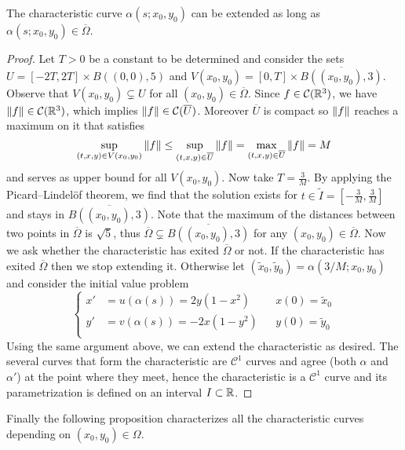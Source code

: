\begin{prop} \label{prop:characteristics_extension}
	The characteristic curve $\alpha(s;x_0,y_0)$ can be extended as
	long as $\alpha(s;x_0,y_0) \in \overline{\Omega}$.
\end{prop}
\begin{proof}
	Let $T > 0$ be a constant to be determined and consider the sets $U = [-2T,
	2T] \times B((0,0), 5)$ and $V(x_0,y_0) = [0,T] \times
	\overline{B((x_0,y_0), 3)}$. Observe that $V(x_0,y_0) \subsetneq U$ for all
	$(x_0,y_0) \in \overline{\Omega}$. Since $f \in \mathcal{C}(\mathbb{R}^3)$, we
	have $\norm{f} \in \mathcal{C}(\mathbb{R}^3)$, which implies $\norm{f} \in
	\mathcal{C}(\overline{U})$. Moreover $\overline{U}$ is compact so $\norm{f}$
	reaches a maximum on it that satisfies
	\[
	\sup_{(t,x,y) \in V(x_0,y_0)} \norm{f} \leq
	\sup_{(t,x,y) \in \overline{U}} \norm{f} = 
	\max_{(t,x,y) \in \overline{U}} \norm{f} = M	
	\]
	and serves as upper bound for all $V(x_0,y_0)$. Now take $T = \frac{3}{M}$.
	By applying the Picard--Lindelöf theorem, we find that the solution exists
	for $t \in \tilde{I} = [-\frac{3}{M}, \frac{3}{M}]$ and stays in
	$\overline{B((x_0,y_0), 3)}$. Note that the maximum of the distances between
	two points in $\overline{\Omega}$ is $\sqrt{5}$, thus $\overline{\Omega}
	\subsetneq \overline{B((x_0,y_0), 3)}$ for any $(x_0,y_0) \in
	\overline{\Omega}$. Now we ask whether the characteristic has exited
	$\overline{\Omega}$ or not. If the characteristic has exited
	$\overline{\Omega}$ then we stop extending it. Otherwise let $(\tilde{x}_0,
	\tilde{y}_0) = \alpha(3/M; x_0, y_0)$ and consider the initial value problem
	\[
		\left\{
			\begin{aligned}
				x' &= u(\alpha(s)) = 2 y (1 - x^2) 		& &x(0) = \tilde{x}_0 \\
				y' &= v(\alpha(s)) = - 2 x (1 - y^2) 	& &y(0) = \tilde{y}_0 \\
			\end{aligned}
		\right.
	\]
	Using the same argument above, we can extend the characteristic as desired.
	The several curves that form the characteristic are $\mathcal{C}^1$ curves
	and agree (both $\alpha$ and $\alpha'$) at the point where they meet, hence
	the characteristic is a $\mathcal{C}^1$ curve and its parametrization is
	defined on an interval $I \subset \mathbb{R}$.
\end{proof}

\noindent
Finally the following proposition characterizes all the characteristic curves
depending on $(x_0, y_0) \in \Omega$.

